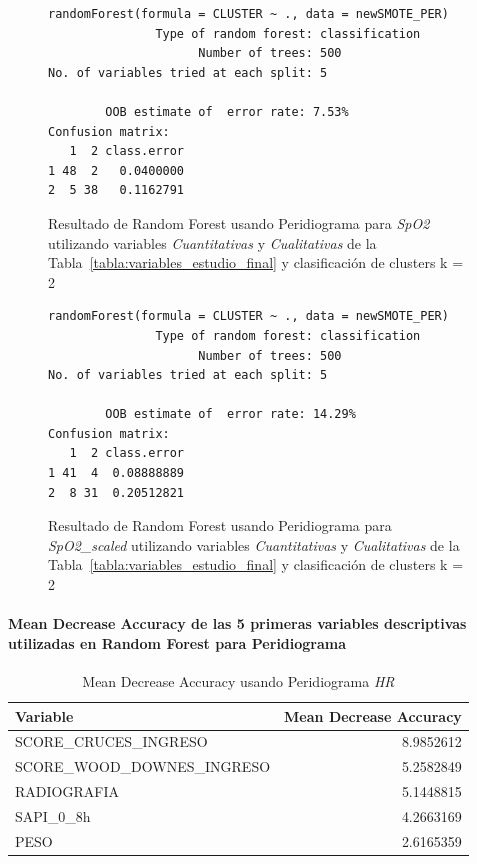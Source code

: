 \begin{figure}[H]
    \centering
    \begin{lstlisting}[frame=single, basicstyle=\small\ttfamily]
        randomForest(formula = CLUSTER ~ ., data = newSMOTE_PER) 
               Type of random forest: classification
                     Number of trees: 500
No. of variables tried at each split: 5

        OOB estimate of  error rate: 7.53%
Confusion matrix:
   1  2 class.error
1 48  2   0.0400000
2  5 38   0.1162791
    \end{lstlisting}
    \caption{Resultado de Random Forest usando Peridiograma para \textit{SpO2} utilizando variables \textit{Cuantitativas} y \textit{Cualitativas} de la Tabla~\ref{tabla:variables_estudio_final} y clasificación de clusters k = 2}\label{fig:random_forest_per_result_4}
\end{figure}
\begin{figure}[H]
    \centering
    \begin{lstlisting}[frame=single, basicstyle=\small\ttfamily]
        randomForest(formula = CLUSTER ~ ., data = newSMOTE_PER) 
               Type of random forest: classification
                     Number of trees: 500
No. of variables tried at each split: 5

        OOB estimate of  error rate: 14.29%
Confusion matrix:
   1  2 class.error
1 41  4  0.08888889
2  8 31  0.20512821
    \end{lstlisting}
    \caption{Resultado de Random Forest usando Peridiograma para \textit{SpO2\_scaled} utilizando variables \textit{Cuantitativas} y \textit{Cualitativas} de la Tabla~\ref{tabla:variables_estudio_final} y clasificación de clusters k = 2}
    \label{fig:random_forest_per_result_5}
\end{figure}

\paragraph{Mean Decrease Accuracy de las 5 primeras variables descriptivas utilizadas en Random Forest para Peridiograma}

\begin{table}[H]
    \centering
    \begin{tabular}{lr}
        \toprule
        \textbf{Variable} & \textbf{Mean Decrease Accuracy} \\
        \midrule
        SCORE\_CRUCES\_INGRESO & 8.9852612 \\
        SCORE\_WOOD\_DOWNES\_INGRESO & 5.2582849 \\
        RADIOGRAFIA & 5.1448815 \\
        SAPI\_0\_8h & 4.2663169 \\
        PESO & 2.6165359 \\
        \bottomrule
    \end{tabular}
    \caption{Mean Decrease Accuracy usando Peridiograma \textit{HR}}
\end{table}

